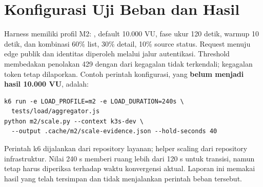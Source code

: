 \section{Konfigurasi Uji Beban dan Hasil}
Harness  memiliki profil M2: , default 10.000 VU, fase ukur 120 detik, warmup 10 detik, dan kombinasi 60\% list, 30\% detail, 10\% source status. Request menuju edge publik dan identitas diperoleh melalui jalur autentikasi. Threshold membedakan penolakan 429 dengan  dari kegagalan tidak terkendali; kegagalan token tetap dilaporkan. Contoh perintah konfigurasi, yang \textbf{belum menjadi hasil 10.000 VU}, adalah:
\begin{lstlisting}
k6 run -e LOAD_PROFILE=m2 -e LOAD_DURATION=240s \
  tests/load/aggregator.js
python m2/scale.py --context k3s-dev \
  --output .cache/m2/scale-evidence.json --hold-seconds 40
\end{lstlisting}
Perintah k6 dijalankan dari repository layanan; helper scaling dari repository infrastruktur. Nilai 240 s memberi ruang lebih dari 120 s untuk transisi, namun tetap harus diperiksa terhadap waktu konvergensi aktual. Laporan ini memakai hasil yang telah tersimpan dan tidak menjalankan perintah beban tersebut.

